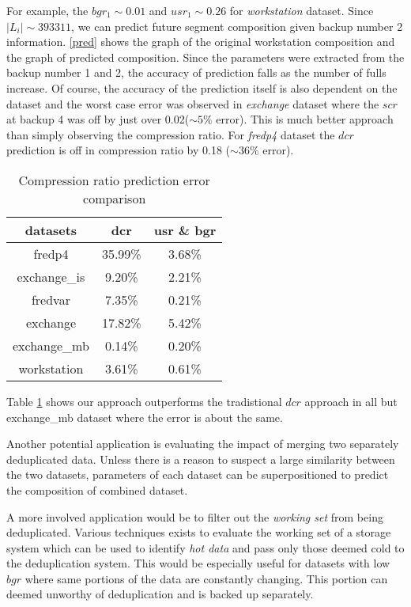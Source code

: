 For example, the $bgr_1\sim 0.01$ and $usr_1\sim 0.26$ for \emph{workstation} dataset. Since $|L_i|\sim393311$,  we can predict future segment composition given backup number 2 information. \figurename \ref{pred} shows the graph of the original workstation composition and the graph of predicted composition. Since the parameters were extracted from the backup number 1 and 2, the accuracy of prediction falls as the number of fulls increase. Of course, the accuracy of the prediction itself is also dependent on the dataset and the worst case error was observed in \emph{exchange} dataset where the $\mathit{scr}$ at backup 4 was off by just over 0.02($\sim5\%$ error). This is much better approach than simply observing the compression ratio. For \emph{fredp4} dataset the $dcr$  prediction is off in compression ratio by 0.18 ($\sim36\%$ error).

\begin{table}[!t]
\renewcommand{\arraystretch}{1.3}
\caption{Compression ratio prediction error comparison}
\label{err}
\centering
\begin{tabular}{c||c c}
\hline
\bfseries datasets &\bfseries dcr	 	&\bfseries usr \& bgr	\\
\hline\hline
fredp4		&35.99\%			&3.68\%					\\
exchange\_is	&9.20\%			&2.21\%				\\
fredvar		&7.35\%			&0.21\%						\\
exchange 		&17.82\%			&5.42\%					\\
exchange\_mb 	&0.14\%			&0.20\%				\\
workstation		&3.61\%			&0.61\%				\\			
\hline
\end{tabular}
\end{table}

Table \ref{err} shows our approach outperforms the tradistional $dcr$ approach in all but exchange\_mb dataset where the error is about the same.

Another potential application is evaluating the impact of merging two separately deduplicated data. Unless there is a reason to suspect a large similarity between the two datasets, parameters of each dataset can be superpositioned to predict the composition of combined dataset. 

A more involved application would be to filter out the \emph{working set} from being deduplicated. Various techniques exists to evaluate the working set of a storage system\cite{lee2009flexfs, wang2004hylog} which can be used to identify \emph{hot data} and pass only those deemed cold to the deduplication system. This would be especially useful for datasets with low $bgr$ where same portions of the data are constantly changing. This portion can deemed unworthy of deduplication and is backed up separately. 

